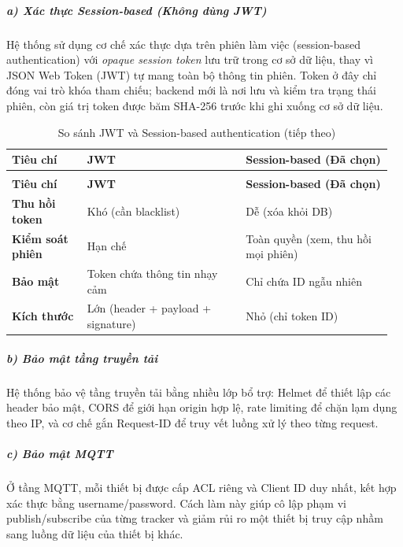 \documentclass[a4paper]{extarticle}
\newcommand{\thesissettableid}[2]{%
  \renewcommand{\thetable}{#1}%
  \renewcommand{\theHtable}{#2}%
}
\begin{document}
\subparagraph{a) Xác thực Session-based (Không dùng
JWT)}\label{a-xuxe1c-thux1ef1c-session-based-khuxf4ng-duxf9ng-jwt}

Hệ thống sử dụng cơ chế xác thực dựa trên phiên làm việc (session-based
authentication) với \emph{opaque session token} lưu trữ trong cơ sở dữ
liệu, thay vì JSON Web Token (JWT) tự mang toàn bộ thông tin phiên. Token
ở đây chỉ đóng vai trò khóa tham chiếu; backend mới là nơi lưu và kiểm
tra trạng thái phiên, còn giá trị token được băm SHA-256 trước khi ghi
xuống cơ sở dữ liệu.


{\thesissettableid{3.23}{tab-ch3-so-sanh-jwt-va-session-based-authentication}
\def\LTcaptype{table}
\begin{longtable}{|L{0.190\linewidth}|L{0.403\linewidth}|L{0.372\linewidth}|}
\caption{So sánh JWT và Session-based authentication}\label{tab:ch3-so-sanh-jwt-va-session-based-authentication}\\
\hline \textbf{Tiêu chí} & \textbf{JWT} & \textbf{Session-based (Đã chọn)} \\
\hline
\endfirsthead
\caption[]{So sánh JWT và Session-based authentication (tiếp theo)}\\
\hline \textbf{Tiêu chí} & \textbf{JWT} & \textbf{Session-based (Đã chọn)} \\
\hline
\endhead
\hline
\endfoot
\endlastfoot
\textbf{Thu hồi token} & Khó (cần blacklist) & Dễ (xóa khỏi DB) \\\hline
\textbf{Kiểm soát phiên} & Hạn chế & Toàn quyền (xem, thu hồi mọi
phiên) \\\hline
\textbf{Bảo mật} & Token chứa thông tin nhạy cảm & Chỉ chứa ID ngẫu
nhiên \\\hline
\textbf{Kích thước} & Lớn (header + payload + signature) & Nhỏ (chỉ
token ID) \\\hline
\end{longtable}
}


\subparagraph{b) Bảo mật tầng truyền
tải}\label{b-bux1ea3o-mux1eadt-tux1ea7ng-truyux1ec1n-tux1ea3i}

Hệ thống bảo vệ tầng truyền tải bằng nhiều lớp bổ trợ: Helmet để thiết
lập các header bảo mật, CORS để giới hạn origin hợp lệ, rate limiting để
chặn lạm dụng theo IP, và cơ chế gắn Request-ID để truy vết luồng xử lý
theo từng request.

\subparagraph{c) Bảo mật MQTT}\label{c-bux1ea3o-mux1eadt-mqtt}

Ở tầng MQTT, mỗi thiết bị được cấp ACL riêng và Client ID duy nhất, kết
hợp xác thực bằng username/password. Cách làm này giúp cô lập phạm vi
publish/subscribe của từng tracker và giảm rủi ro một thiết bị truy cập
nhầm sang luồng dữ liệu của thiết bị khác.
\end{document}
